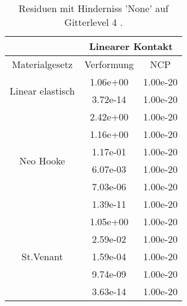 \begin{table} 
\centering 
\begin{tabular}{c|cc|} 
\cline{2-3} 
 & \multicolumn{2}{|c|}{Linearer Kontakt} \\ 
\hline 
\multicolumn{1}{|c|}{Materialgesetz} & \multicolumn{1}{c|}{Verformung} & \multicolumn{1}{c|}{NCP} \\ 
\hline 
\multicolumn{1}{|c|}{\multirow{2}{*}{Linear elastisch}} &\multicolumn{1}{|c|}{  1.06e+00} & \multicolumn{1}{|c|}{  1.00e-20} \\ 
\multicolumn{1}{|c|}{} & \multicolumn{1}{|c|}{  3.72e-14} & \multicolumn{1}{|c|}{  1.00e-20} \\ 
\hline 
\multicolumn{1}{|c|}{\multirow{6}{*}{Neo Hooke}} &\multicolumn{1}{|c|}{  2.42e+00} & \multicolumn{1}{|c|}{  1.00e-20} \\ 
\multicolumn{1}{|c|}{} & \multicolumn{1}{|c|}{  1.16e+00} & \multicolumn{1}{|c|}{  1.00e-20} \\ 
\multicolumn{1}{|c|}{} & \multicolumn{1}{|c|}{  1.17e-01} & \multicolumn{1}{|c|}{  1.00e-20} \\ 
\multicolumn{1}{|c|}{} & \multicolumn{1}{|c|}{  6.07e-03} & \multicolumn{1}{|c|}{  1.00e-20} \\ 
\multicolumn{1}{|c|}{} & \multicolumn{1}{|c|}{  7.03e-06} & \multicolumn{1}{|c|}{  1.00e-20} \\ 
\multicolumn{1}{|c|}{} & \multicolumn{1}{|c|}{  1.39e-11} & \multicolumn{1}{|c|}{  1.00e-20} \\ 
\hline 
\multicolumn{1}{|c|}{\multirow{5}{*}{St.Venant}} &\multicolumn{1}{|c|}{  1.05e+00} & \multicolumn{1}{|c|}{  1.00e-20} \\ 
\multicolumn{1}{|c|}{} & \multicolumn{1}{|c|}{  2.59e-02} & \multicolumn{1}{|c|}{  1.00e-20} \\ 
\multicolumn{1}{|c|}{} & \multicolumn{1}{|c|}{  1.59e-04} & \multicolumn{1}{|c|}{  1.00e-20} \\ 
\multicolumn{1}{|c|}{} & \multicolumn{1}{|c|}{  9.74e-09} & \multicolumn{1}{|c|}{  1.00e-20} \\ 
\multicolumn{1}{|c|}{} & \multicolumn{1}{|c|}{  3.63e-14} & \multicolumn{1}{|c|}{  1.00e-20} \\ 
\hline 
\end{tabular}\caption{Residuen mit Hinderniss 'None' auf Gitterlevel 4 .}\label{tab:Residuum_None_level4}
\end{table} 

